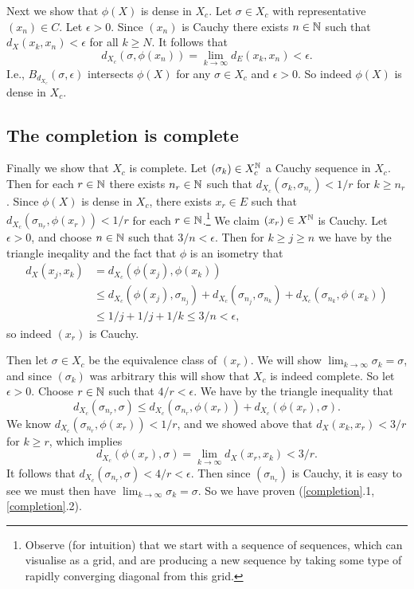 \medskip
Next we show that $\phi(X)$ is dense in $X_c$. Let $\sigma \in X_c$
with representative $(x_n) \in C$. Let $\epsilon > 0$. Since $(x_n)$
is Cauchy there exists $n \in \mathbb{N}$ such that $d_X(x_k,x_n) < \epsilon$
for all $k \ge N$. It follows that
\[
d_{X_c}(\sigma, \phi(x_n)) = \lim_{k \to \infty} d_E(x_k, x_n) <
\epsilon.
\]
I.e., $B_{d_{X_c}}(\sigma, \epsilon)$ intersects $\phi(X)$ for any
$\sigma \in X_c$ and $\epsilon > 0$. So indeed $\phi(X)$ is dense in
$X_c$.


\subsection{The completion is complete}

Finally we show that $X_c$ is complete. Let $(\sigma_k) \in X_c^{\mathbb{N}}$
a Cauchy sequence in $X_c$. Then for each $r \in \mathbb{N}$ there exists $n_r
\in \mathbb{N}$ such that $d_{X_c} (\sigma_k, \sigma_{n_r}) < 1/r$ for $k \ge
n_r$. Since $\phi(X)$ is dense in $X_c$, there exists $x_r \in E$ such
that $d_{X_c}(\sigma_{n_r}, \phi(x_r)) < 1/r$ for each $r \in
\mathbb{N}$.\footnote{Observe (for intuition) that we start with a sequence of
  sequences, which can visualise as a grid, and are producing a new
  sequence by taking some type of rapidly converging diagonal from
  this grid.} We claim $(x_r) \in X^{\mathbb{N}}$ is Cauchy. Let $\epsilon > 0$,
and choose $n \in \mathbb{N}$ such that $3/n < \epsilon$. Then for $k \ge j
\ge n$ we have by the triangle ineqality and the fact that $\phi$ is
an isometry that
\begin{align*}
  d_X(x_j,x_k) &= d_{X_c}(\phi(x_j),\phi(x_k)) \\ &\le
  d_{X_c}(\phi(x_j), \sigma_{n_j}) + d_{X_c}(\sigma_{n_j},
  \sigma_{n_k}) + d_{X_c}(\sigma_{n_k}, \phi(x_k)) \\ &\le 1/j + 1/j +
  1/k \le 3/n < \epsilon,
\end{align*}
so indeed $(x_r)$ is Cauchy.

\medskip
Then let $\sigma \in X_c$ be the equivalence class of $(x_r)$. We will
show $\lim_{k \to \infty} \sigma_k = \sigma$, and since $(\sigma_k)$
was arbitrary this will show that $X_c$ is indeed complete. So let
$\epsilon > 0$. Choose $r \in \mathbb{N}$ such that $4/r < \epsilon$. We have
by the triangle inequality that
\[
d_{X_c}(\sigma_{n_r}, \sigma) \le d_{X_c}(\sigma_{n_r}, \phi(x_r)) +
d_{X_c}(\phi(x_r), \sigma).
\]
We know $d_{X_c}(\sigma_{n_r}, \phi(x_r)) < 1/r$, and we showed above
that $d_X(x_k,x_r) < 3/r$ for $k \ge r$, which implies
\[
d_{X_c}(\phi(x_r), \sigma) = \lim_{k \to \infty} d_X(x_r,x_k) < 3/r.
\]
It follows that $d_{X_c}(\sigma_{n_r}, \sigma) < 4/r < \epsilon$. Then
since $(\sigma_{n_r})$ is Cauchy, it is easy to see we must then have
$\lim_{k \to \infty} \sigma_k = \sigma$. So we have proven
(\ref{completion}.1, \ref{completion}.2).

